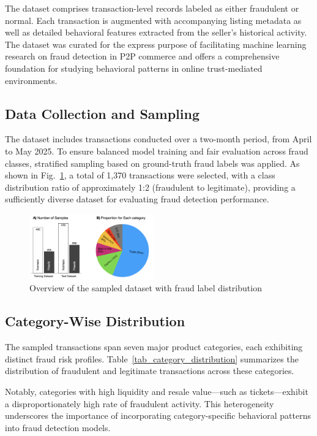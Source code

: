 \documentclass[sigconf]{acmart}
\begin{document}
The dataset comprises transaction-level records labeled as either fraudulent or normal. Each transaction is augmented with accompanying listing metadata as well as detailed behavioral features extracted from the seller's historical activity. The dataset was curated for the express purpose of facilitating machine learning research on fraud detection in P2P commerce and offers a comprehensive foundation for studying behavioral patterns in online trust-mediated environments.

\subsection{Data Collection and Sampling}
The dataset includes transactions conducted over a two-month period, from April to May 2025. To ensure balanced model training and fair evaluation across fraud classes, stratified sampling based on ground-truth fraud labels was applied. As shown in Fig.~\ref{fig_dataset}, a total of 1,370 transactions were selected, with a class distribution ratio of approximately 1:2 (fraudulent to legitimate), providing a sufficiently diverse dataset for evaluating fraud detection performance.

\begin{figure}[t!]
  \centering
  \includegraphics[width=0.48\textwidth]{figures/fig1_dataset.png}
  \caption{Overview of the sampled dataset with fraud label distribution}
  \label{fig_dataset}
\end{figure}

\subsection{Category-Wise Distribution}
The sampled transactions span seven major product categories, each exhibiting distinct fraud risk profiles. Table~\ref{tab_category_distribution} summarizes the distribution of fraudulent and legitimate transactions across these categories.


Notably, categories with high liquidity and resale value—such as tickets—exhibit a disproportionately high rate of fraudulent activity. This heterogeneity underscores the importance of incorporating category-specific behavioral patterns into fraud detection models.
\end{document}
